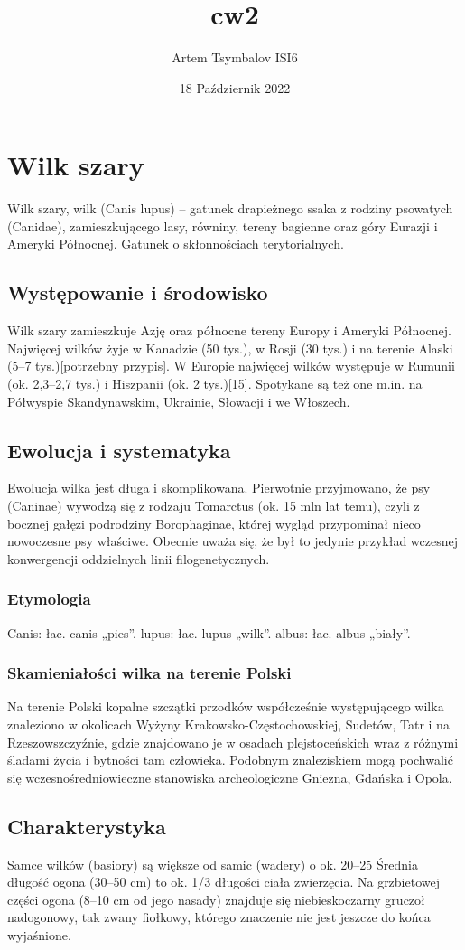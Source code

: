 \documentclass[12pt, letterpaper, titlepage]{article}
\title{cw2}
\author{Artem Tsymbalov ISI6}
\date{18 Październik 2022}
\begin{document}
\maketitle
\section{Wilk szary}
Wilk szary, wilk (Canis lupus) – gatunek drapieżnego ssaka z rodziny psowatych (Canidae), zamieszkującego lasy, równiny, tereny bagienne oraz góry Eurazji i Ameryki Północnej. Gatunek o skłonnościach terytorialnych.
\subsection{Występowanie i środowisko}
Wilk szary zamieszkuje Azję oraz północne tereny Europy i Ameryki Północnej.
Najwięcej wilków żyje w Kanadzie (50 tys.), w Rosji (30 tys.) i na terenie Alaski (5–7 tys.)[potrzebny przypis]. W Europie najwięcej wilków występuje w Rumunii (ok. 2,3–2,7 tys.) i Hiszpanii (ok. 2 tys.)[15]. Spotykane są też one m.in. na Półwyspie Skandynawskim, Ukrainie, Słowacji i we Włoszech.
\subsection{Ewolucja i systematyka}
Ewolucja wilka jest długa i skomplikowana. Pierwotnie przyjmowano, że psy (Caninae) wywodzą się z rodzaju Tomarctus (ok. 15 mln lat temu), czyli z bocznej gałęzi podrodziny Borophaginae, której wygląd przypominał nieco nowoczesne psy właściwe. Obecnie uważa się, że był to jedynie przykład wczesnej konwergencji oddzielnych linii filogenetycznych. 
\subsubsection{Etymologia}
Canis: łac. canis „pies”.
lupus: łac. lupus „wilk”.
albus: łac. albus „biały”.
\subsubsection{Skamieniałości wilka na terenie Polski}
Na terenie Polski kopalne szczątki przodków współcześnie występującego wilka znaleziono w okolicach Wyżyny Krakowsko-Częstochowskiej, Sudetów, Tatr i na Rzeszowszczyźnie, gdzie znajdowano je w osadach plejstoceńskich wraz z różnymi śladami życia i bytności tam człowieka. Podobnym znaleziskiem mogą pochwalić się wczesnośredniowieczne stanowiska archeologiczne Gniezna, Gdańska i Opola.
\subsection{Charakterystyka}
Samce wilków (basiory) są większe od samic (wadery) o ok. 20–25%
Średnia długość ogona (30–50 cm) to ok. 1/3 długości ciała zwierzęcia. Na grzbietowej części ogona (8–10 cm od jego nasady) znajduje się niebieskoczarny gruczoł nadogonowy, tak zwany fiołkowy, którego znaczenie nie jest jeszcze do końca wyjaśnione.
\end{document}
